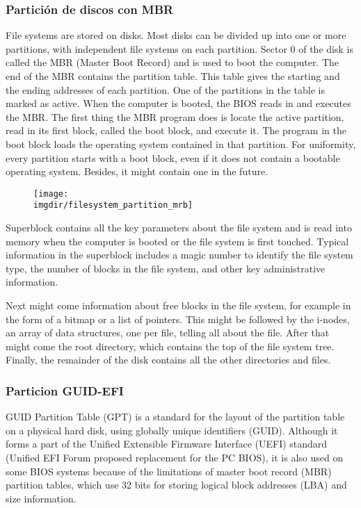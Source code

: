\documentclass[a4paper, twoside]{article}
\newcommand{\imgdir}{../resources/images} %
\begin{document}
\subsubsection{Partición de discos con MBR}
File systems are stored on disks. Most disks can be divided up into one or more partitions, with independent file systems on each partition. Sector 0 of the disk is called the MBR (Master Boot Record) and is used to boot the computer. The end of the MBR contains the partition table. This table gives the starting and the ending addresses of each partition. One of the partitions in the table is marked as active. When the computer is booted, the BIOS reads in and executes the MBR. The first thing the MBR program does is locate the active partition, read in its first block, called the boot block, and execute it. The program in the boot block loads the operating system contained in that partition. For uniformity, every partition starts with a boot block, even if it does not contain a bootable operating system. Besides, it might contain one in the future.

\begin{figure}[h]
	\centering
	\texttt{[image: \\imgdir/filesystem\_partition\_mrb]}
	\label{fig:filesystem_partition_mrb}
\end{figure}

Superblock contains all the key parameters about the file system and is read into memory when the computer is booted or the file system is first touched. Typical information in the superblock includes a magic number to identify the file system type, the number of blocks in the file system, and other key administrative information.

Next might come information about free blocks in the file system, for example in the form of a bitmap or a list of pointers. This might be followed by the i-nodes, an array of data structures, one per file, telling all about the file. After that might come the root directory, which contains the top of the file system tree. Finally, the remainder of the disk contains all the other directories and files.

\subsubsection{Particion GUID-EFI}
GUID Partition Table (GPT) is a standard for the layout of the partition table on a physical hard disk, using globally unique identifiers (GUID). Although it forms a part of the Unified Extensible Firmware Interface (UEFI) standard (Unified EFI Forum proposed replacement for the PC BIOS), it is also used on some BIOS systems because of the limitations of master boot record (MBR) partition tables, which use 32 bits for storing logical block addresses (LBA) and size information.
\end{document}
